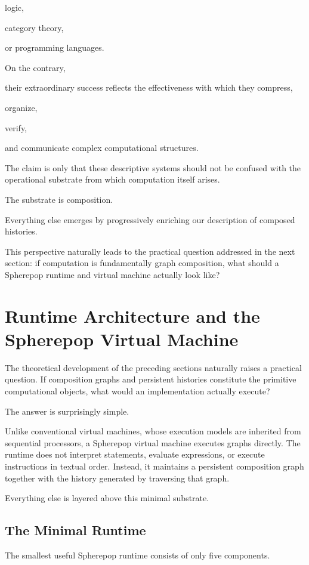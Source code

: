 \documentclass[12pt,oneside]{article}
\begin{document}
logic,

category theory,

or programming languages.

On the contrary,

their extraordinary success reflects the effectiveness with which they compress,

organize,

verify,

and communicate complex computational structures.

The claim is only that these descriptive systems should not be confused with the operational substrate from which computation itself arises.

The substrate is composition.

Everything else emerges by progressively enriching our description of composed histories.

This perspective naturally leads to the practical question addressed in the next section: if computation is fundamentally graph composition, what should a Spherepop runtime and virtual machine actually look like?

\section{Runtime Architecture and the Spherepop Virtual Machine}

The theoretical development of the preceding sections naturally raises a practical question. If composition graphs and persistent histories constitute the primitive computational objects, what would an implementation actually execute?

The answer is surprisingly simple.

Unlike conventional virtual machines, whose execution models are inherited from sequential processors, a Spherepop virtual machine executes graphs directly. The runtime does not interpret statements, evaluate expressions, or execute instructions in textual order. Instead, it maintains a persistent composition graph together with the history generated by traversing that graph.

Everything else is layered above this minimal substrate.

\subsection{The Minimal Runtime}

The smallest useful Spherepop runtime consists of only five components.
\end{document}
